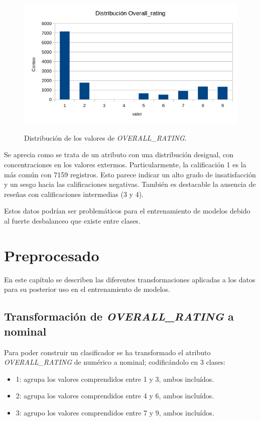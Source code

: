 \documentclass[es]{uc3mreport}
\begin{document}
\begin{report}
\begin{figure}[H]
    \center
    \includegraphics[width=0.85\linewidth]{distribucion_overall.png}\\
    \caption{Distribución de los valores de \textit{OVERALL\_RATING}.}
    \label{distribucion-overall}
\end{figure}

Se aprecia como se trata de un atributo con una distribución desigual, con
concentraciones en los valores extermos. Particularmente, la calificación 1 es
la más común con 7159 registros. Esto parece indicar un alto grado de
insatisfacción y un sesgo hacia las calificaciones negativas.
También es destacable la ausencia de reseñas con calificaciones intermedias (3 y
4).

Estos datos podrían ser problemáticos para el entrenamiento de modelos debido al
fuerte desbalanceo que existe entre clases.

\section{Preprocesado}
\label{chap:preprocess}
En este capítulo se describen las diferentes transformaciones aplicadas a los datos para su posterior uso en el entrenamiento de modelos.

\subsection{Transformación de \textit{OVERALL\_RATING} a nominal}
\label{sec:overalltransform}
Para poder construir un clasificador se ha transformado el atributo \textit{OVERALL\_RATING} de numérico a nominal; codificándolo en 3 clases:
\begin{itemize}
    \item 1: agrupa los valores comprendidos entre 1 y 3, ambos incluídos.
    \item 2: agrupa los valores comprendidos entre 4 y 6, ambos incluídos.
    \item 3: agrupo los valores comprendidos entre 7 y 9, ambos incluídos.
\end{itemize}


\end{report}
\end{document}
